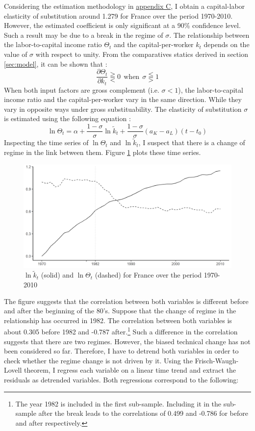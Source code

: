 Considering the estimation methodology in \hyperref[appendix:sigma]{appendix C}, I obtain a capital-labor elasticity of substitution around 1.279 for France over the period 1970-2010. However, the estimated coefficient is only significant at a 90\% confidence level. Such a result may be due to a break in the regime of $\sigma$. The relationship between the labor-to-capital income ratio $\Theta_t$ and the capital-per-worker $k_t$ depends on the value of $\sigma$ with respect to unity. From the comparatives statics derived in section \ref{sec:model}, it can be shown that :
	\begin{equation*}
		\frac{\partial \Theta_t}{\partial k_t} \gtreqqless 0 ~~ \text{when} ~~ \sigma \lesseqqgtr 1
	\end{equation*}
When both input factors are gross complement (i.e. $\sigma < 1$), the labor-to-capital income ratio and the capital-per-worker vary in the same direction. While they vary in opposite ways under gross substituability. The elasticity of substitution $\sigma$ is estimated using the following equation :
	\begin{equation*}
	\ln \Theta_t = \alpha + \frac{1-\sigma}{\sigma} \ln \tilde{k}_t + \frac{1-\sigma}{\sigma}(a_K-a_L)\left(t-t_0\right)
	\end{equation*}
Inspecting the time series of $\ln \Theta_t$ and $\ln \tilde{k}_t$, I suspect that there is a change of regime in the link between them. Figure \ref{fig:k_Theta_log} plots these time series.
	\begin{figure}[tb]
		\centering
		\includegraphics[width=1\linewidth]{../result/appendix_CD/k_Theta_log.png}
		\caption{$\ln \tilde{k}_t$ (solid) and $\ln \Theta_t$ (dashed) for France over the period 1970-2010}
		\label{fig:k_Theta_log}
	\end{figure}
The figure suggests that the correlation between both variables is different before and after the beginning of the 80's. Suppose that the change of regime in the relationship has occurred in 1982. The correlation between both variables is about 0.305 before 1982 and -0.787 after.\footnote{The year 1982 is included in the first sub-sample. Including it in the sub-sample after the break leads to the correlations of 0.499 and -0.786 for before and after respectively.} Such a difference in the correlation suggests that there are two regimes. However, the biased technical change has not been considered so far. Therefore, I have to detrend both variables in order to check whether the regime change is not driven by it. Using the Frisch-Waugh-Lovell theorem, I regress each variable on a linear time trend and extract the residuals as detrended variables. Both regressions correspond to the following:
